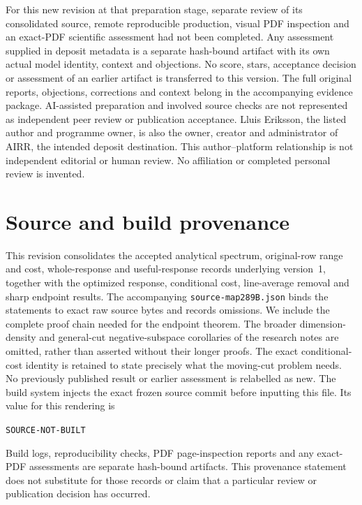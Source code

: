 \documentclass[11pt]{article}
\providecommand{\SourceCommit}{SOURCE-NOT-BUILT}
\theoremstyle{definition}
\theoremstyle{remark}
\begin{document}
For this new revision at that preparation stage, separate review of its consolidated source,
remote reproducible production, visual PDF inspection and an exact-PDF
scientific assessment had not been completed. Any assessment supplied in
deposit metadata is a separate hash-bound artifact with its own actual
model identity, context and objections. No score, stars, acceptance
decision or assessment of an earlier artifact is transferred to this
version. The full original reports, objections, corrections and context
belong in the accompanying evidence package. AI-assisted preparation and
involved source checks are not represented as independent peer review or
publication acceptance. Lluis Eriksson, the listed author and programme
owner, is also the owner, creator and administrator of AIRR, the intended
deposit destination. This author--platform relationship is not independent
editorial or human review. No affiliation or completed personal review is
invented.

\appendix
\section{Source and build provenance}\label{app:provenance}
This revision consolidates the accepted analytical spectrum, original-row
range and cost, whole-response and useful-response records underlying
version~1, together with the optimized response, conditional cost,
line-average removal and sharp endpoint results. The accompanying
\texttt{source-map289B.json} binds the statements to exact raw source
bytes and records omissions. We include the complete proof chain needed
for the endpoint theorem. The broader dimension-density and general-cut
negative-subspace corollaries of the research notes are omitted, rather
than asserted without their longer proofs. The exact conditional-cost
identity is retained to state precisely what the moving-cut problem needs.
No previously published result or earlier assessment is relabelled as new.
The build system injects the exact frozen source commit before inputting
this file. Its value for this rendering is
\begin{center}\texttt{\SourceCommit}\end{center}
Build logs, reproducibility checks, PDF page-inspection reports and any
exact-PDF assessments are separate hash-bound artifacts. This provenance
statement does not substitute for those records or claim that a particular
review or publication decision has occurred.
\end{document}
